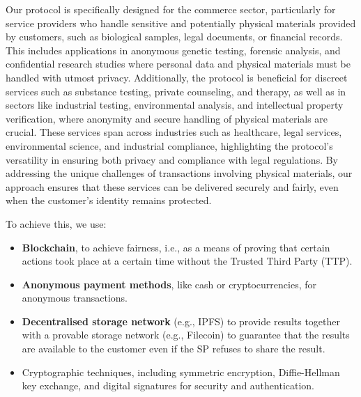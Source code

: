 \documentclass[pdftex,twocolumn,epjc3]{svjour3}
\begin{document}
\begin{sloppypar}
Our protocol is specifically designed for the commerce sector, particularly for service providers who handle sensitive and potentially physical materials provided by customers, such as biological samples, legal documents, or financial records. This includes applications in anonymous genetic testing, forensic analysis, and confidential research studies where personal data and physical materials must be handled with utmost privacy. Additionally, the protocol is beneficial for discreet services such as substance testing, private counseling, and therapy, as well as in sectors like industrial testing, environmental analysis, and intellectual property verification, where anonymity and secure handling of physical materials are crucial. These services span across industries such as healthcare, legal services, environmental science, and industrial compliance, highlighting the protocol's versatility in ensuring both privacy and compliance with legal regulations. By addressing the unique challenges of transactions involving physical materials, our approach ensures that these services can be delivered securely and fairly, even when the customer's identity remains protected.
\end{sloppypar}

\begin{sloppypar}
To achieve this, we use:
\begin{itemize}
  \item \textbf{Blockchain}, to achieve fairness, i.e., as a means of proving that certain actions took place at a certain time without the Trusted Third Party (TTP).
  \item \textbf{Anonymous payment methods}, like cash or cryptocurrencies, for anonymous transactions.
  \item \textbf{Decentralised storage network} (e.g., IPFS) to provide results together with a provable storage network (e.g., Filecoin) to guarantee that the results are available to the customer even if the SP refuses to share the result.
  \item Cryptographic techniques, including symmetric encryption, Diffie-Hellman key exchange, and digital signatures for security and authentication.
\end{itemize}
\end{sloppypar}
\end{document}
